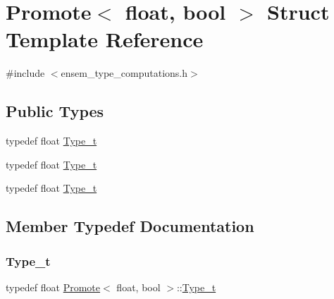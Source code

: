 \hypertarget{structPromote_3_01float_00_01bool_01_4}{}\section{Promote$<$ float, bool $>$ Struct Template Reference}
\label{structPromote_3_01float_00_01bool_01_4}


{\ttfamily \#include $<$ensem\+\_\+type\+\_\+computations.\+h$>$}

\subsection*{Public Types}
\begin{DoxyCompactItemize}
\item 
typedef float \mbox{\hyperlink{structPromote_3_01float_00_01bool_01_4_a4a81b15631e324d8d2dade1c48484b63}{Type\+\_\+t}}
\item 
typedef float \mbox{\hyperlink{structPromote_3_01float_00_01bool_01_4_a4a81b15631e324d8d2dade1c48484b63}{Type\+\_\+t}}
\item 
typedef float \mbox{\hyperlink{structPromote_3_01float_00_01bool_01_4_a4a81b15631e324d8d2dade1c48484b63}{Type\+\_\+t}}
\end{DoxyCompactItemize}


\subsection{Member Typedef Documentation}
\mbox{\label{structPromote_3_01float_00_01bool_01_4_a4a81b15631e324d8d2dade1c48484b63}} 
\subsubsection{\texorpdfstring{Type\_t}{Type\_t}\hspace{0.1cm}{\footnotesize\ttfamily [1/3]}}
{\footnotesize\ttfamily typedef float \mbox{\hyperlink{structPromote}{Promote}}$<$ float, bool $>$\+::\mbox{\hyperlink{structPromote_3_01float_00_01bool_01_4_a4a81b15631e324d8d2dade1c48484b63}{Type\+\_\+t}}}

\mbox{\label{structPromote_3_01float_00_01bool_01_4_a4a81b15631e324d8d2dade1c48484b63}} 
